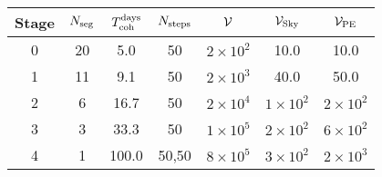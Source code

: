 \begin{tabular}{c|cccccc}
Stage & $N_{\rm seg}$ & $T_{\rm coh}^{\rm days}$ &$N_{\rm steps}$ & $\mathcal{V}$ & $\mathcal{V}_{\rm Sky}$ & $\mathcal{V}_{\rm PE}$ \\ \hline
0 & 20 & 5.0 & 50 & $2{\times}10^{2}$ & 10.0 & 10.0 \\
1 & 11 & 9.1 & 50 & $2{\times}10^{3}$ & 40.0 & 50.0 \\
2 & 6 & 16.7 & 50 & $2{\times}10^{4}$ & $1{\times}10^{2}$ & $2{\times}10^{2}$ \\
3 & 3 & 33.3 & 50 & $1{\times}10^{5}$ & $2{\times}10^{2}$ & $6{\times}10^{2}$ \\
4 & 1 & 100.0 & 50,50 & $8{\times}10^{5}$ & $3{\times}10^{2}$ & $2{\times}10^{3}$ \\
\end{tabular}
